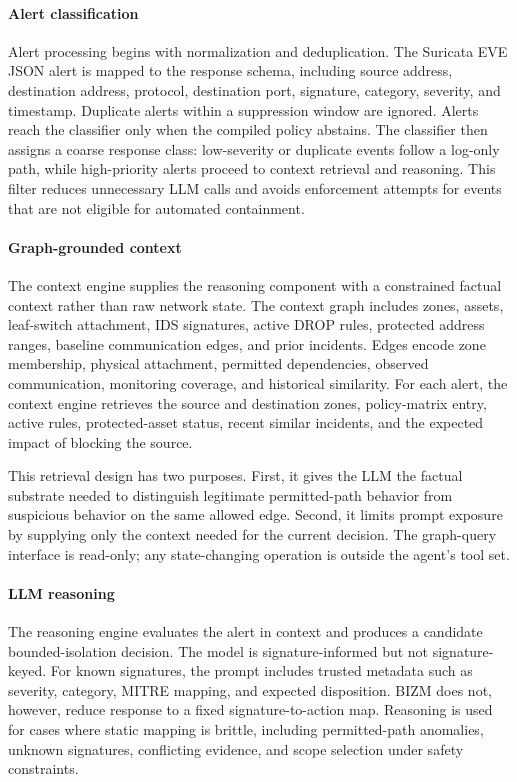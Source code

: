 \documentclass[final,5p]{elsarticle}
\begin{document}
\paragraph{Alert classification}
Alert processing begins with normalization and deduplication. The Suricata EVE JSON alert is mapped to the response schema, including source address, destination address, protocol, destination port, signature, category, severity, and timestamp. Duplicate alerts within a suppression window are ignored. Alerts reach the classifier only when the compiled policy abstains. The classifier then assigns a coarse response class: low-severity or duplicate events follow a log-only path, while high-priority alerts proceed to context retrieval and reasoning. This filter reduces unnecessary LLM calls and avoids enforcement attempts for events that are not eligible for automated containment.

\paragraph{Graph-grounded context}
The context engine supplies the reasoning component with a constrained factual context rather than raw network state. The context graph includes zones, assets, leaf-switch attachment, IDS signatures, active DROP rules, protected address ranges, baseline communication edges, and prior incidents. Edges encode zone membership, physical attachment, permitted dependencies, observed communication, monitoring coverage, and historical similarity. For each alert, the context engine retrieves the source and destination zones, policy-matrix entry, active rules, protected-asset status, recent similar incidents, and the expected impact of blocking the source.

This retrieval design has two purposes. First, it gives the LLM the factual substrate needed to distinguish legitimate permitted-path behavior from suspicious behavior on the same allowed edge. Second, it limits prompt exposure by supplying only the context needed for the current decision. The graph-query interface is read-only; any state-changing operation is outside the agent's tool set.

\paragraph{LLM reasoning}
The reasoning engine evaluates the alert in context and produces a candidate bounded-isolation decision. The model is signature-informed but not signature-keyed. For known signatures, the prompt includes trusted metadata such as severity, category, MITRE mapping, and expected disposition. BIZM does not, however, reduce response to a fixed signature-to-action map. Reasoning is used for cases where static mapping is brittle, including permitted-path anomalies, unknown signatures, conflicting evidence, and scope selection under safety constraints.
\end{document}
